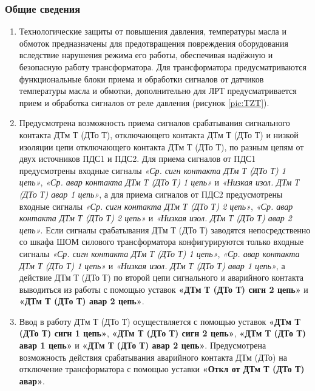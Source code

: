 \color{black}

\subsubsection{Общие сведения}

\begin{enumerate}[label=\arabic{section}.\arabic{subsection}.\arabic{subsubsection}.\arabic*,  align=left, labelsep=4pt, leftmargin=0pt, itemindent=57pt]

\item
Технологические защиты от повышения давления, температуры масла и обмоток предназначены
для предотвращения повреждения оборудования вследствие нарушения режима его работы,
обеспечивая надёжную и безопасную работу трансформатора. Для трансформатора
предусматриваются функциональные блоки приема и обработки сигналов от датчиков температуры
масла и обмотки, дополнительно для ЛРТ предусматривается прием и обработка сигналов от реле
давления (рисунок \ref{pic:TZT}). 

\item
Предусмотрена возможность приема сигналов срабатывания сигнального контакта ДТм Т (ДТо Т),
отключающего контакта ДТм Т (ДТо Т) и низкой изоляции цепи отключающего контакта ДТм Т (ДТо Т), по
разным цепям от двух источников ПДС1 и ПДС2. Для приема сигналов от ПДС1 предусмотрены входные
сигналы \textit{«Ср. сигн контакта ДТм Т (ДТо Т) 1 цепь»}, \textit{«Ср. авар контакта ДТм Т (ДТо Т) 1 цепь»} и
\textit{«Низкая изол. ДТм Т (ДТо Т) авар 1 цепь»}, а для приема сигналов от ПДС2 предусмотрены входные
сигналы \textit{«Ср. сигн контакта ДТм Т (ДТо Т) 2 цепь»}, \textit{«Ср. авар контакта ДТм Т (ДТо Т) 2 цепь»} и
\textit{«Низкая изол. ДТм Т (ДТо Т) авар 2 цепь»}. Если сигналы срабатывания ДТм Т (ДТо Т) заводятся
непосредственно со шкафа ШОМ силового трансформатора конфигурируются только входные сигналы
\textit{«Ср. сигн контакта ДТм Т (ДТо Т) 1 цепь»}, \textit{«Ср. авар контакта ДТм Т (ДТо Т) 1 цепь»} и \textit{«Низкая изол.
ДТм Т (ДТо Т) авар 1 цепь»}, а действие ДТм Т (ДТо Т) по второй цепи сигнального и аварийного контакта
выводиться из работы с помощью уставок \textbf{«ДТм Т (ДТо Т) сигн 2 цепь»} и \textbf{«ДТм Т (ДТо Т) авар 2 цепь»}.

\item
Ввод в работу ДТм Т (ДТо Т) осуществляется с помощью уставок \textbf{«ДТм Т (ДТо Т) сигн 1 цепь»},
\textbf{«ДТм Т (ДТо Т) сигн 2 цепь»}, \textbf{«ДТм Т  (ДТо Т) авар 1 цепь»} и \textbf{«ДТм Т (ДТо Т) авар 2 цепь»}.
Предусмотрена возможность действия срабатывания аварийного контакта ДТм (ДТо) на отключение
трансформатора с помощью уставки \textbf{«Откл от ДТм Т (ДТо Т) авар»}.


\end{enumerate}
